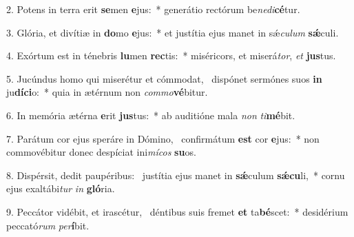 2. Potens in terra erit \textbf{se}men \textbf{e}jus:~*  generátio rectórum be\textit{ne}\textit{di}\textbf{cé}tur.\

3. Glória, et divítiæ in \textbf{do}mo \textbf{e}jus:~*  et justítia ejus manet in sǽ\textit{cu}\textit{lum} \textbf{sǽ}culi.\

4. Exórtum est in ténebris \textbf{lu}men \textbf{rec}tis:~*  miséricors, et miserá\textit{tor}, \textit{et} \textbf{jus}tus.\

5. Jucúndus homo qui miserétur et cómmodat, \dag\  dispónet sermónes suos \textbf{in} ju\textbf{dí}\textbf{ci}o:~*  quia in ætérnum non \textit{com}\textit{mo}\textbf{vé}bitur.\

6. In memória ætérna \textbf{e}rit \textbf{jus}tus:~*  ab auditióne mala \textit{non} \textit{ti}\textbf{mé}bit.\

7. Parátum cor ejus speráre in Dómino, \dag\  confirmátum \textbf{est} cor \textbf{e}jus:~*  non commovébitur donec despíciat ini\textit{mí}\textit{cos} \textbf{su}os.\

8. Dispérsit, dedit paupéribus: \dag\  justítia ejus manet in \textbf{sǽ}culum \textbf{sǽ}\textbf{cu}li,~*  cornu ejus exaltábi\textit{tur} \textit{in} \textbf{gló}ria.\

9. Peccátor vidébit, et irascétur, \dag\  déntibus suis fremet \textbf{et} ta\textbf{bé}scet:~*  desidérium peccató\textit{rum} \textit{per}\textbf{í}bit.\

